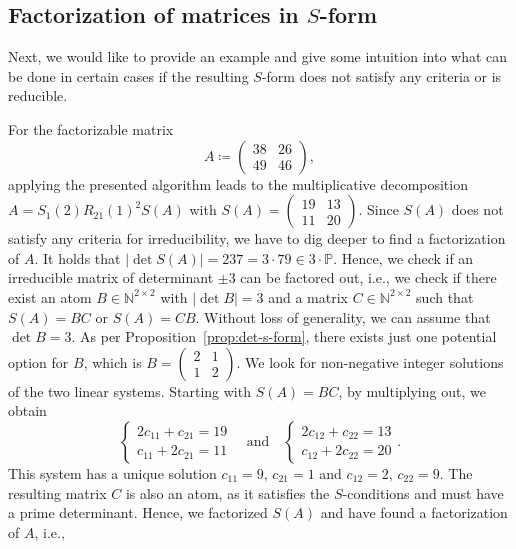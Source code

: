 \subsection{Factorization of matrices in $S$-form}

Next, we would like to provide an example and give some intuition into what can be done in certain cases if the resulting $S$-form does not satisfy any criteria or is reducible.

\begin{example}\label{ex:fac-educated-guessing}
For the factorizable matrix 
\[ A \coloneqq \begin{pmatrix} 38 & 26 \\ 49 & 46 \end{pmatrix}, \]
applying the presented algorithm leads to the multiplicative decomposition $A = S_1(2)R_{21}(1)^2S(A)$ with $S(A) = \begin{pmatrix} 19 & 13 \\ 11 & 20 \end{pmatrix}$. Since $S(A)$ does not satisfy any criteria for irreducibility, we have to dig deeper to find a factorization of $A$. It holds that $\left \lvert \det{S(A)} \right \rvert = 237 = 3\cdot 79 \in 3\cdot \mathbb{P}$. Hence, we check if an irreducible matrix of determinant $\pm 3$ can be factored out, i.e., we check if there exist an atom $B \in \mathbb{N}^{2 \times 2}$ with $\left \lvert \det{B} \right \rvert = 3$ and a matrix $C \in \mathbb{N}^{2 \times 2}$ such that $S(A) =BC$ or $S(A) = CB$.  Without loss of generality, we can assume that $\det{B} =3$. As per Proposition~\ref{prop:det-s-form}, there exists just one potential option for $B$, which is $B = \begin{pmatrix} 2 & 1 \\ 1 & 2\end{pmatrix}$. We look for non-negative integer solutions of the two linear systems. Starting with $S(A) = BC$, by multiplying out, we obtain
\[ \begin{cases} 2c_{11}  + c_{21} = 19 \\ c_{11}  + 2c_{21} = 11 \end{cases} \quad \text{and} \quad \begin{cases}2c_{12} + c_{22} = 13 \\ c_{12} + 2c_{22} = 20 \end{cases}.\]
This system has a unique solution $c_{11} = 9$, $c_{21} = 1$ and $c_{12} = 2$, $c_{22} = 9$. The resulting matrix $C$ is also an atom, as it satisfies the $S$-conditions and must have a prime determinant. Hence, we factorized $S(A)$ and have found a factorization of $A$, i.e.,

\end{example}
